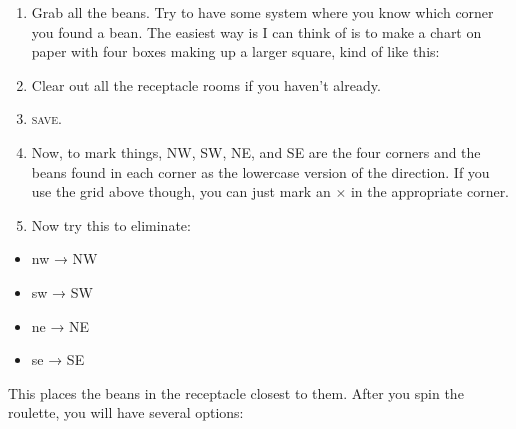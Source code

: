 \documentclass[11pt,twoside,openright]{report}
\providecommand{\tightlist}{%
  \setlength{\itemsep}{0pt}\setlength{\parskip}{0pt}}
\newcommand\textlcsc[1]{\texorpdfstring{\textsc{\MakeLowercase{#1}}}{#1}}
\begin{document}
\begin{enumerate}[leftmargin=*]
\def\labelenumi{\arabic{enumi}.}
\item
  Grab all the beans. Try to have some system where you know which
  corner you found a bean. The easiest way is I can think of is to make
  a chart on paper with four boxes making up a larger square, kind of
  like this:
%
\begin{center}
\end{center}

\item
  Clear out all the receptacle rooms if you haven't already.
\item
  \textlcsc{SAVE}.
\item
  Now, to mark things, NW, SW, NE, and SE are the four corners and the
  beans found in each corner as the lowercase version of the direction.
  If you use the grid above though, you can just mark an $\times$ in the
  appropriate corner.
\item
  Now try this to eliminate:
\end{enumerate}
%
\begin{itemize}
  \tightlist
\item
  nw → NW
\item
  sw → SW
\item
  ne → NE
\item
  se → SE
\end{itemize}

This places the beans in the receptacle closest to them. After you spin
the roulette, you will have several options:
\end{document}
